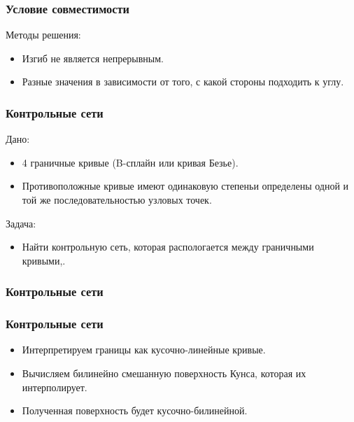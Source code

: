 \documentclass[14pt]{beamer}
\begin{document}
\begin{frame}
\frametitle{Условие совместимости}
Методы решения:
\begin{itemize}
  \item Изгиб не является непрерывным.
  \item Разные значения в зависимости от того, с какой стороны подходить к углу.
\end{itemize}
\end{frame}

\begin{frame}
\frametitle{Контрольные сети}
Дано:
\begin{itemize}
  \item 4 граничные кривые (B-сплайн или кривая Безье).
  \item Противоположные кривые имеют одинаковую степеньи определены одной и той
  же последовательностью узловых точек.
\end{itemize}
Задача:
\begin{itemize}
  \item Найти контрольную сеть, которая распологается между граничными кривыми,.
\end{itemize}
\end{frame}

\begin{frame}
\frametitle{Контрольные сети}
\end{frame}

\begin{frame}
\frametitle{Контрольные сети}
\begin{itemize}
  \item Интерпретируем границы как кусочно-линейные кривые.
  \item Вычисляем билинейно смешанную поверхность Кунса, которая их интерполирует.
  \item Полученная поверхность будет кусочно-билинейной.
\end{itemize}
\end{frame}
\end{document}
